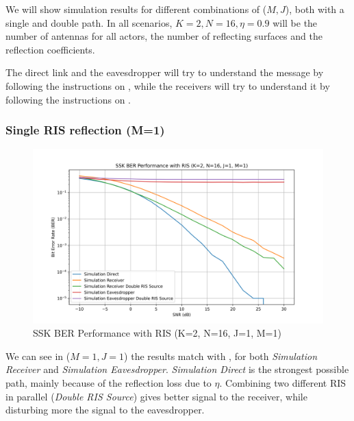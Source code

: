 We will show simulation results for different combinations of ($M, J$), both with a single and double path. In all scenarios, $K = 2, N = 16, \eta = 0.9$ will be the number of antennas for all actors, the number of reflecting surfaces and the reflection coefficients.

The direct link and the eavesdropper will try to understand the message by following the instructions on \cite{5165332}, while the receivers will try to understand it by following the instructions on \cite{9328149}.

\subsubsection{Single RIS reflection (M=1)}

\begin{figure}[H]
  \centering
  \includegraphics[width=\linewidth]{imgs/ber-simulations/SSK BER Performance with RIS (K=2, N=16, J=1, M=1).png}
  \caption{SSK BER Performance with RIS (K=2, N=16, J=1, M=1)}
  \label{fig:simulation_j1_m1}
\end{figure}

We can see in ($M=1, J=1$) the results match with \cite{9328149}, for both \textit{Simulation Receiver} and \textit{Simulation Eavesdropper}.
\textit{Simulation Direct} is the strongest possible path, mainly because of the reflection loss due to $\eta$.
Combining two different RIS in parallel (\textit{Double RIS Source}) gives better signal to the receiver, while disturbing more the signal to the eavesdropper.

